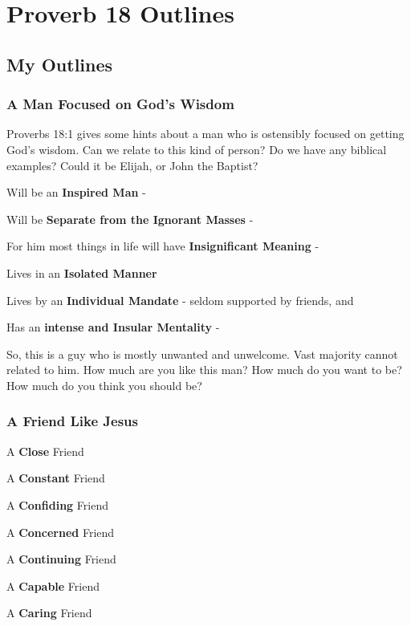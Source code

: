 \section{Proverb 18 Outlines}

\subsection{My Outlines}

\subsubsection{A Man Focused on God's Wisdom}
Proverbs 18:1 gives some hints about a man who is ostensibly focused on getting God's wisdom. Can we relate to this kind of person? Do we have any biblical examples? Could it be Elijah, or John the Baptist?
\begin{compactenum}[I.]
    \item Will be an \textbf{Inspired Man} - 
    \item Will be \textbf{Separate from the Ignorant Masses} - 
    \item For him most things in life will have  \textbf{Insignificant Meaning} - 
    \item Lives in an \textbf{Isolated Manner} 
    \item Lives by an \textbf{Individual Mandate} -  seldom supported by friends, and 
    \item Has an \textbf{intense and Insular Mentality} - 
\end{compactenum}
So, this is a guy who is mostly unwanted and unwelcome. Vast majority cannot related to him. How much are you like this man? How much do you want to be? How much do you think you should be?

\subsubsection{A Friend Like Jesus}
\begin{compactenum}[I.][8]
    \item A \textbf{Close} Friend
    \item A \textbf{Constant} Friend
    \item A \textbf{Confiding} Friend
    \item A \textbf{Concerned} Friend
    \item A \textbf{Continuing} Friend
    \item A \textbf{Capable} Friend
    \item A \textbf{Caring} Friend
\end{compactenum}


